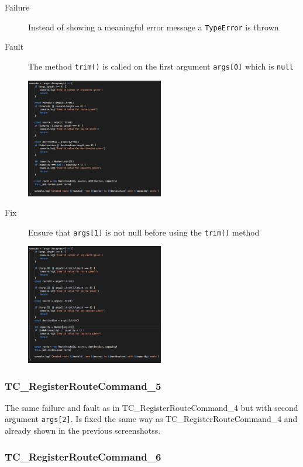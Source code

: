 \documentclass[11pt]{article}
\begin{document}
\begin{description}
\item[{Failure}] Instead of showing a meaningful error message a \texttt{TypeError} is thrown
\item[{Fault}] The method \texttt{trim()} is called on the first argument \texttt{args[0]} which is \texttt{null}
\begin{center}
\includegraphics[width=6cm]{./Iteration3.rtfd/Pasted Graphic 7.tiff.png}
\end{center}
\item[{Fix}] Ensure that \texttt{args[1]} is not null before using the \texttt{trim()} method
\begin{center}
\includegraphics[width=6cm]{./Iteration3.rtfd/Pasted Graphic 14.tiff.png}
\end{center}
\end{description}

\subsubsection{TC\_RegisterRouteCommand\_5}
\label{sec:org5738169}

The same failure and fault as in TC\_RegisterRouteCommand\_4 but with second argument \texttt{args[2]}. Is fixed the same way as TC\_RegisterRouteCommand\_4 and already shown in the previous screenshotss.

\subsubsection{TC\_RegisterRouteCommand\_6}
\label{sec:org0654cd9}
\end{document}
